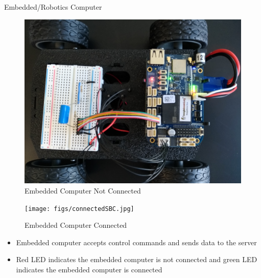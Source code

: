 \documentclass{beamer}
\begin{document}
\begin{frame}{Embedded/Robotics Computer}{} %
    \begin{multicols}{2}
        \begin{figure}
            \centering
            \includegraphics[scale=0.04]{figs/notConnectedSBC.jpg}
            \caption{Embedded Computer Not Connected}
            \label{fig:not_connected_bb}
        \end{figure}
        
        \begin{figure}
            \centering
            \texttt{[image: figs/connectedSBC.jpg]}
            \caption{Embedded Computer Connected}
            \label{fig:connected_bb}
        \end{figure}
    \end{multicols}
    \begin{block}{}
      \begin{small}
        \begin{itemize}
            \item Embedded computer accepts control commands and sends data to the server
            \item Red LED indicates the embedded computer is not connected and green LED indicates the embedded computer is connected
        \end{itemize}
      \end{small}
    \end{block}
\end{frame}
\end{document}
